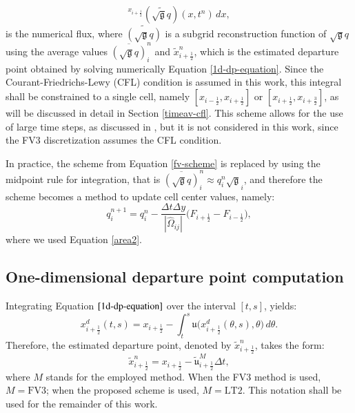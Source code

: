 \documentclass[preprint,12pt]{elsarticle}
\begin{document}
\begin{linenumbers}
\begin{equation}
	 ^{x_{i+\frac{1}{2}}}
	 (\widetilde{\sqrt{\mathfrak{g}}{q}})(x, t^n) \,dx,
\end{equation} 
is the numerical flux, where $\widetilde{(\sqrt{\mathfrak{g}}{q})}$ is a subgrid reconstruction function of $\sqrt{\mathfrak{g}}{q}$ using the average values $\overline{(\sqrt{\mathfrak{g}}q)}^{n}_{i}$ and $\tilde{x}_{i+\frac{1}{2}}^n$, which is the estimated departure point obtained by solving numerically Equation \eqref{1d-dp-equation}.
Since the Courant-Friedrichs-Lewy (CFL) condition is assumed in this work, this integral shall be constrained to a single cell, namely $[x_{i-\frac{1}{2}},x_{i+\frac{1}{2}}]$ or $[x_{i+\frac{1}{2}},x_{i+\frac{3}{2}}]$, as will be discussed in detail in Section \ref{timeav-cfl}.
This scheme allows for the use of large time steps, as discussed in \cite{lin:1996,chen:2017}, but it is not considered in this work, since the FV3 discretization assumes the CFL condition.

In practice, the scheme from Equation \eqref{fv-scheme} is replaced by using the midpoint rule for integration, that is $\overline{(\sqrt{\mathfrak{g}}q)}_{i}^n \approx q_{i}^n\sqrt{\mathfrak{g}}_{i}$, and therefore the scheme becomes a method to update cell center values, namely:
\begin{equation}
	\label{fv-scheme-mdp}
	{q}^{n+1}_{i} = {q}^{n}_{i} - \frac{\Delta t \Delta y}{|\hat{\Omega}_{ij}|}
	\bigg({F}_{i+\frac{1}{2}}-
	{F}_{i-\frac{1}{2}}\bigg),
\end{equation}
where we used Equation \eqref{area2}.

\subsection{One-dimensional departure point computation}
Integrating Equation $\eqref{1d-dp-equation}$ over the interval $[t,s]$, yields:
\begin{equation}
	\label{dp-integral}
	x_{i+\frac{1}{2}}^d(t,s) = x_{i+\frac{1}{2}} - \int_{t}^{s}{\mathfrak{u}}\big( x_{i+\frac{1}{2}}^d(\theta,s), \theta\big) \,d\theta.
\end{equation}
Therefore, the estimated departure point, denoted by $\tilde{x}_{i+\frac{1}{2}}^n$, takes the form:
\begin{equation}
	\label{dp-estimated}
	\tilde{x}_{i+\frac{1}{2}}^n = x_{i+\frac{1}{2}} - {\tilde{\mathfrak{u}}}^{M}_{i+\frac{1}{2}}\Delta t,
\end{equation}
where $M$ stands for the employed method.
When the FV3 method is used, $M=\text{FV3}$; when the proposed scheme is used, $M=\text{LT2}$. This notation shall be used for the remainder of this work.


\end{linenumbers}
\end{document}
